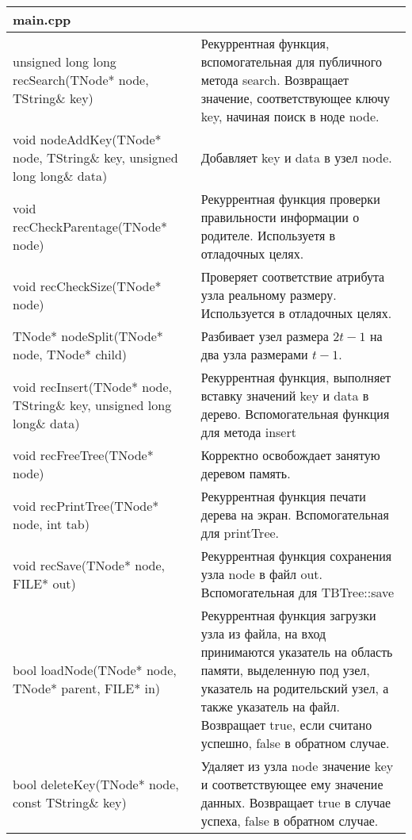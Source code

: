 \begin{longtable}{|p{7.5cm}|p{7.5cm}|}
\hline
\rowcolor{lightgray}
\multicolumn{2}{|c|} {main.cpp}\\
\hline
{\ttfamily unsigned long long recSearch(TNode* node, TString\& key)}&Рекуррентная функция, вспомогательная для публичного метода {\ttfamily search}. Возвращает значение, соответствующее ключу {\ttfamily key}, начиная поиск в ноде {\ttfamily node}.\\
\hline
{\ttfamily void nodeAddKey(TNode* node, TString\& key, unsigned long long\& data)}&Добавляет {\ttfamily key} и {\ttfamily data} в узел {\ttfamily node}.\\
\hline
{\ttfamily void recCheckParentage(TNode* node)}&Рекуррентная функция проверки правильности информации о родителе. Используетя в отладочных целях.\\
\hline
{\ttfamily void recCheckSize(TNode* node)}&Проверяет соответствие атрибута узла реальному размеру. Используется в отладочных целях.\\
\hline
{\ttfamily TNode* nodeSplit(TNode* node, TNode* child)}&Разбивает узел размера $2t-1$ на два узла размерами $t-1$.\\
\hline
{\ttfamily void recInsert(TNode* node, TString\& key, unsigned long long\& data)}&Рекуррентная функция, выполняет вставку значений {\ttfamily key} и {\ttfamily data} в дерево. Вспомогательная функция для метода {\ttfamily insert}\\
\hline
{\ttfamily void recFreeTree(TNode* node)}&Корректно освобождает занятую деревом память.\\
\hline
{\ttfamily void recPrintTree(TNode* node, int tab)}&Рекуррентная функция печати дерева на экран. Вспомогательная для {\ttfamily printTree}.\\
\hline
{\ttfamily void recSave(TNode* node, FILE* out)}&Рекуррентная функция сохранения узла {\ttfamily node} в файл {\ttfamily out}. Вспомогательная для {\ttfamily TBTree::save}\\
\hline
{\ttfamily bool loadNode(TNode* node, TNode* parent, FILE* in)}&Рекуррентная функция загрузки узла из файла, на вход принимаются указатель на область памяти, выделенную под узел, указатель на родительский узел, а также указатель на файл. Возвращает {\ttfamily true}, если считано успешно, {\ttfamily false} в обратном случае.\\
\hline
{\ttfamily bool deleteKey(TNode* node, const TString\& key)}&Удаляет из узла {\ttfamily node} значение {\ttfamily key} и соответствующее ему значение данных. Возвращает {\ttfamily true} в случае успеха, {\ttfamily false} в обратном случае.\\

\end{longtable}
